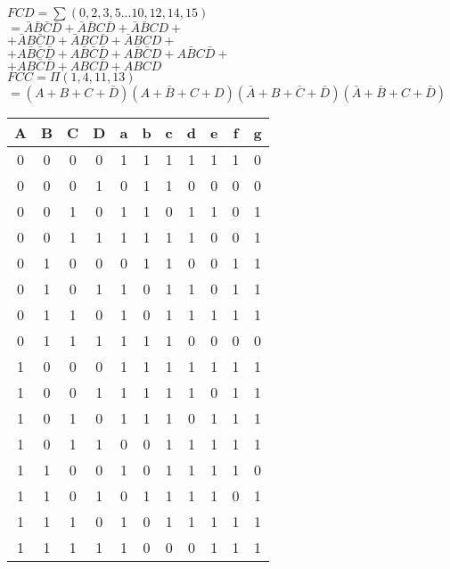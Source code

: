 \documentclass[12pt]{article}
\begin{document}
\begin{figure}[h!]
    \begin{minipage}{0.45\textwidth}
       $FCD=\sum(0,2,3,5...10,12,14,15)$\\
       $=\bar{A}\bar{B}\bar{C}\bar{D}+\bar{A}\bar{B}C\bar{D}+\bar{A}\bar{B}CD+$\\
       $+\bar{A}B\bar{C}D+\bar{A}BC\bar{D}+\bar{A}BCD+$\\
       $+A\bar{B}\bar{C}\bar{D}+A\bar{B}\bar{C}\bar{D}+A\bar{B}\bar{C}D+A\bar{B}C\bar{D}+$\\
       $+AB\bar{C}\bar{D}+ABC\bar{D}+ABCD$\\
       $FCC=\Pi(1,4,11,13)$\\
       $=(A+B+C+\bar{D})(A+\bar{B}+C+D)(\bar{A}+B+\bar{C}+\bar{D})(\bar{A}+\bar{B}+C+\bar{D})$\\
    \end{minipage}
    \hfill
    \begin{minipage}{0.5\textwidth}
        \begin{tabular}{|c|c|c|c|c|c|c|c|c|c|c|}
            \hline
            A & B & C & D & a & b & c & d & e & f & g \\ \hline
            0 & 0 & 0 & 0 & 1 & 1 & 1 & 1 & 1 & 1 & 0 \\ \hline
            0 & 0 & 0 & 1 & 0 & 1 & 1 & 0 & 0 & 0 & 0 \\ \hline
            0 & 0 & 1 & 0 & 1 & 1 & 0 & 1 & 1 & 0 & 1 \\ \hline
            0 & 0 & 1 & 1 & 1 & 1 & 1 & 1 & 0 & 0 & 1 \\ \hline
            0 & 1 & 0 & 0 & 0 & 1 & 1 & 0 & 0 & 1 & 1 \\ \hline
            0 & 1 & 0 & 1 & 1 & 0 & 1 & 1 & 0 & 1 & 1 \\ \hline
            0 & 1 & 1 & 0 & 1 & 0 & 1 & 1 & 1 & 1 & 1 \\ \hline
            0 & 1 & 1 & 1 & 1 & 1 & 1 & 0 & 0 & 0 & 0 \\ \hline
            1 & 0 & 0 & 0 & 1 & 1 & 1 & 1 & 1 & 1 & 1 \\ \hline
            1 & 0 & 0 & 1 & 1 & 1 & 1 & 1 & 0 & 1 & 1 \\ \hline
            1 & 0 & 1 & 0 & 1 & 1 & 1 & 0 & 1 & 1 & 1 \\ \hline
            1 & 0 & 1 & 1 & 0 & 0 & 1 & 1 & 1 & 1 & 1 \\ \hline
            1 & 1 & 0 & 0 & 1 & 0 & 1 & 1 & 1 & 1 & 0 \\ \hline
            1 & 1 & 0 & 1 & 0 & 1 & 1 & 1 & 1 & 0 & 1 \\ \hline
            1 & 1 & 1 & 0 & 1 & 0 & 1 & 1 & 1 & 1 & 1 \\ \hline
            1 & 1 & 1 & 1 & 1 & 0 & 0 & 0 & 1 & 1 & 1 \\ \hline
        \end{tabular}
    \end{minipage}
\end{figure}
\end{document}
